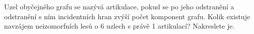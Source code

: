 \subsubsection{}
Uzel obyčejného grafu se nazývá artikulace, pokud se po jeho odstranění a
odstranění s ním incidentních hran zvýší počet komponent grafu. Kolik existuje
navzájem neizomorfních lesů o 6 uzlech s právě 1 artikulací? Nakreslete je.
